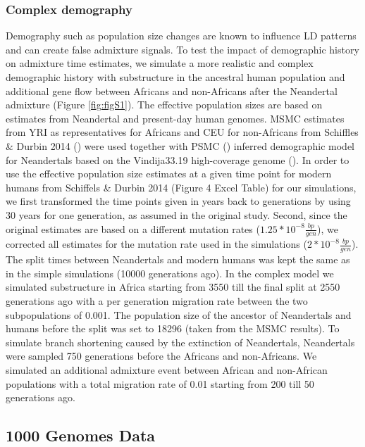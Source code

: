 \documentclass[]{article}
\begin{document}
\subsubsection{Complex demography}\label{inferred demography}

Demography such as population size changes are known to influence LD
patterns and can create false admixture signals. To test the impact of
demographic history on admixture time estimates, we simulate a more
realistic and complex demographic history with substructure in the ancestral human population and additional gene flow between Africans and non-Africans after the Neandertal admixture (Figure \ref{fig:figS1}). The 
effective population
sizes are based on estimates from Neandertal and present-day human
genomes. MSMC estimates from YRI as representatives for Africans and CEU
for non-Africans from Schiffles \& Durbin 2014
(\cite{schiffels_inferring_2014}) were used together with PSMC
(\cite{li_inference_2011}) inferred demographic model for Neandertals
based on the Vindija33.19 high-coverage genome
(\cite{prufer_high-coverage_2017}). In order to use the effective
population size estimates at a given time point for modern humans from
Schiffels \& Durbin 2014 (Figure 4 Excel Table) for our simulations, we
first transformed the time points given in years back to generations by
using 30 years for one generation, as assumed in the original study.
Second, since the original estimates are based on a different mutation
rates (\(1.25*10^{-8} \frac{bp}{gen}\)), we corrected all estimates for
the mutation rate used in the simulations
(\(2*10^{-8} \frac{bp}{gen}\)). The split times between Neandertals and
modern humans was kept the
same as in the simple simulations (10000 generations ago). In the complex model we simulated substructure in Africa starting from 3550 till the final split at 2550 generations ago with a per generation migration rate between the two subpopulations of 0.001. The population size of the ancestor of Neandertals and
humans before the split was set to 18296 (taken from the MSMC results). To simulate branch shortening
caused by the extinction of Neandertals, Neandertals were sampled 750
generations before the Africans and non-Africans. We simulated an additional admixture event between African and non-African populations with a total migration rate of 0.01 starting from 200 till 50 generations ago.

\subsection{1000 Genomes Data}\label{1000 Genomes Data}
\end{document}
